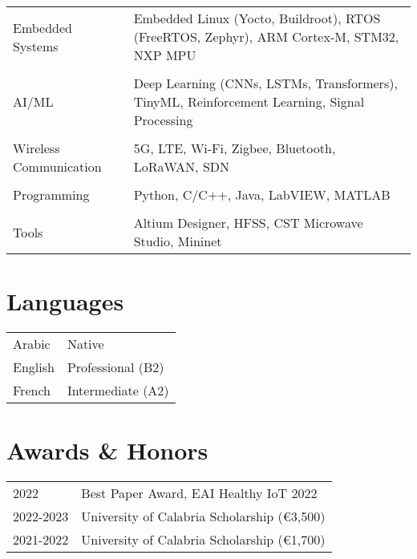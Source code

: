 \documentclass[a4paper,12pt]{article}
\begin{document}
\begin{tabularx}{\linewidth}{@{}l X@{}}
Embedded Systems &  
    \normalsize{Embedded Linux (Yocto, Buildroot), RTOS (FreeRTOS, Zephyr), ARM Cortex-M, STM32, NXP MPU} \\
    \\
AI/ML &  
    \normalsize{Deep Learning (CNNs, LSTMs, Transformers), TinyML, Reinforcement Learning, Signal Processing} \\
    \\
Wireless Communication &  
    \normalsize{5G, LTE, Wi-Fi, Zigbee, Bluetooth, LoRaWAN, SDN} \\
    \\
Programming &  
    \normalsize{Python, C/C++, Java, LabVIEW, MATLAB} \\
    \\
Tools &  
    \normalsize{Altium Designer, HFSS, CST Microwave Studio, Mininet} \\
\end{tabularx}


\section{Languages}
\begin{tabularx}{\linewidth}{@{}l X@{}}
Arabic &  \normalsize{Native} \\
English &  \normalsize{Professional (B2)} \\
French &  \normalsize{Intermediate (A2)} \\
\end{tabularx}


\section{Awards \& Honors}
\begin{tabularx}{\linewidth}{@{}l X@{}}	
2022 & Best Paper Award, EAI Healthy IoT 2022 \\
2022-2023 & University of Calabria Scholarship (€3,500) \\
2021-2022 & University of Calabria Scholarship (€1,700) \\
\end{tabularx}
\end{document}
